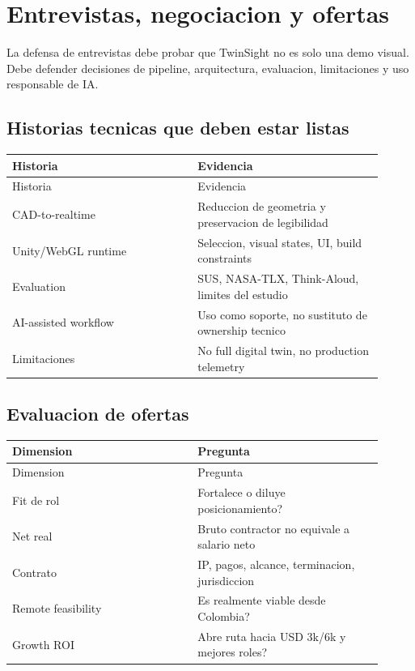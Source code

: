 \chapter{Entrevistas, negociacion y ofertas}


La defensa de entrevistas debe probar que TwinSight no es solo una demo visual. Debe defender decisiones de pipeline, arquitectura, evaluacion, limitaciones y uso responsable de IA.


\section{Historias tecnicas que deben estar listas}


\begin{center}
\scriptsize
\begin{longtable}{>{\raggedright\arraybackslash}p{0.455\linewidth} >{\raggedright\arraybackslash}p{0.455\linewidth}}
\toprule
Historia & Evidencia \\
\midrule
\endfirsthead
\toprule
Historia & Evidencia \\
\midrule
\endhead
CAD-to-realtime & Reduccion de geometria y preservacion de legibilidad \\
Unity/WebGL runtime & Seleccion, visual states, UI, build constraints \\
Evaluation & SUS, NASA-TLX, Think-Aloud, limites del estudio \\
AI-assisted workflow & Uso como soporte, no sustituto de ownership tecnico \\
Limitaciones & No full digital twin, no production telemetry \\
\bottomrule
\end{longtable}
\end{center}


\section{Evaluacion de ofertas}


\begin{center}
\scriptsize
\begin{longtable}{>{\raggedright\arraybackslash}p{0.455\linewidth} >{\raggedright\arraybackslash}p{0.455\linewidth}}
\toprule
Dimension & Pregunta \\
\midrule
\endfirsthead
\toprule
Dimension & Pregunta \\
\midrule
\endhead
Fit de rol & Fortalece o diluye posicionamiento? \\
Net real & Bruto contractor no equivale a salario neto \\
Contrato & IP, pagos, alcance, terminacion, jurisdiccion \\
Remote feasibility & Es realmente viable desde Colombia? \\
Growth ROI & Abre ruta hacia USD 3k/6k y mejores roles? \\
\bottomrule
\end{longtable}
\end{center}



